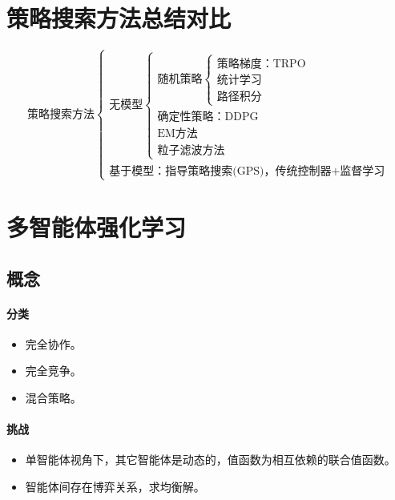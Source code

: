\documentclass[
12pt, %
a4paper, 
oneside, %
headinclude,footinclude, %
]{scrartcl}
\begin{document}
\section{策略搜索方法总结对比}
$$
\text{策略搜索方法} \begin{cases} 
\text{无模型} \begin{cases} 
\text{随机策略} \begin{cases} 
\text{策略梯度：TRPO} \\ \text{统计学习} \\ \text{路径积分} \end{cases} \\ 
\text{确定性策略：DDPG} \\ \text{EM方法} \\ \text{粒子滤波方法} \end{cases} \\ 
\text{基于模型：指导策略搜索(GPS)，传统控制器+监督学习} \end{cases}
$$
\section{多智能体强化学习}
\subsection[概念]{概念}
\noindent
\begin{minipage}{0.3\textwidth}
\paragraph{分类}
\begin{itemize}
\item 完全协作。
\item 完全竞争。
\item 混合策略。
\end{itemize}
\end{minipage}
\begin{minipage}{0.7\textwidth}
\paragraph{挑战}
\begin{itemize}
\item 单智能体视角下，其它智能体是动态的，值函数为相互依赖的联合值函数。
\item 智能体间存在博弈关系，求均衡解。
\end{itemize}
\end{minipage}
\end{document}
